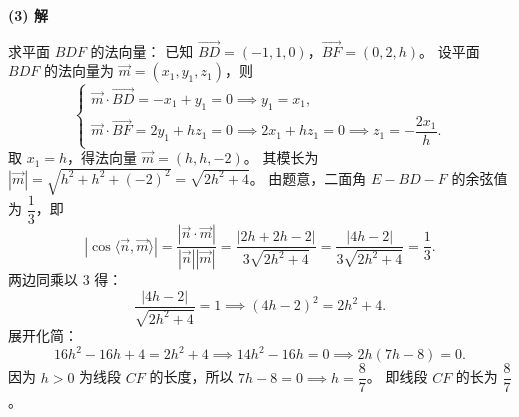 \begin{answer}
\textbf{(3) 解}

求平面 $BDF$ 的法向量：
已知 $\vec{BD} = (-1, 1, 0)$，$\vec{BF} = (0, 2, h)$。
设平面 $BDF$ 的法向量为 $\vec{m} = (x_1, y_1, z_1)$，则
\nopagebreak[4]
\[
\begin{cases}
\vec{m} \cdot \vec{BD} = -x_1 + y_1 = 0 \implies y_1 = x_1, \\
\vec{m} \cdot \vec{BF} = 2y_1 + hz_1 = 0 \implies 2x_1 + hz_1 = 0 \implies z_1 = -\dfrac{2x_1}{h}.
\end{cases}
\]
取 $x_1 = h$，得法向量 $\vec{m} = (h, h, -2)$。
其模长为 $|\vec{m}| = \sqrt{h^2 + h^2 + (-2)^2} = \sqrt{2h^2 + 4}$。
由题意，二面角 $E - BD - F$ 的余弦值为 $\dfrac{1}{3}$，即
\nopagebreak[4]
\[|\cos\langle \vec{n}, \vec{m} \rangle| = \frac{|\vec{n} \cdot \vec{m}|}{|\vec{n}| |\vec{m}|} = \frac{|2h + 2h - 2|}{3\sqrt{2h^2 + 4}} = \frac{|4h - 2|}{3\sqrt{2h^2 + 4}} = \frac{1}{3}.\]
两边同乘以 $3$ 得：
\nopagebreak[4]
\[\frac{|4h - 2|}{\sqrt{2h^2 + 4}} = 1 \implies (4h - 2)^2 = 2h^2 + 4.\]
展开化简：
\nopagebreak[4]
\[16h^2 - 16h + 4 = 2h^2 + 4 \implies 14h^2 - 16h = 0 \implies 2h(7h - 8) = 0.\]
因为 $h > 0$ 为线段 $CF$ 的长度，所以 $7h - 8 = 0 \implies h = \dfrac{8}{7}$。
即线段 $CF$ 的长为 $\dfrac{8}{7}$。




\end{answer}
